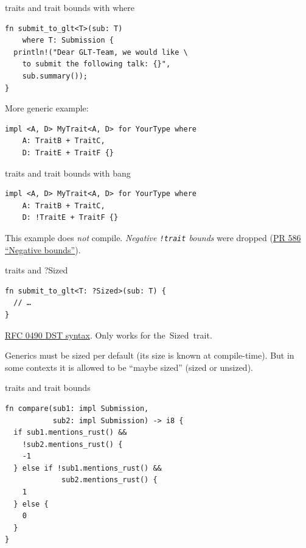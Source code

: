 \documentclass{beamer}
\newcommand\code[1]{\,{\color[HTML]{884400}#1}\,}
\begin{document}

\begin{frame}[fragile]{traits and trait bounds with where}
  \begin{verbatim}
fn submit_to_glt<T>(sub: T)
    where T: Submission {
  println!("Dear GLT-Team, we would like \
    to submit the following talk: {}",
    sub.summary());
}
  \end{verbatim}

  More generic example:
  \begin{verbatim}
impl <A, D> MyTrait<A, D> for YourType where
    A: TraitB + TraitC,
    D: TraitE + TraitF {}
  \end{verbatim}
\end{frame}

\begin{frame}[fragile]{traits and trait bounds with bang}
  \begin{verbatim}
impl <A, D> MyTrait<A, D> for YourType where
    A: TraitB + TraitC,
    D: !TraitE + TraitF {}
  \end{verbatim}

  This example does \emph{not} compile. \emph{Negative \texttt{!trait} bounds} were dropped (\href{https://github.com/rust-lang/rfcs/pull/586}{PR 586 \enquote{Negative bounds}}).
\end{frame}

\begin{frame}[fragile]{traits and ?Sized}
  \begin{verbatim}
fn submit_to_glt<T: ?Sized>(sub: T) {
  // …
}
  \end{verbatim}

  \href{https://github.com/rust-lang/rfcs/blob/master/text/0490-dst-syntax.md}{RFC 0490 DST syntax}. Only works for the \code{Sized} trait.

  Generics must be sized per default (its size is known at compile-time).
  But in some contexts it is allowed to be \enquote{maybe sized} (sized or unsized).
\end{frame}

\begin{frame}[fragile]{traits and trait bounds}
  \begin{verbatim}
fn compare(sub1: impl Submission,
           sub2: impl Submission) -> i8 {
  if sub1.mentions_rust() &&
    !sub2.mentions_rust() {
    -1
  } else if !sub1.mentions_rust() &&
             sub2.mentions_rust() {
    1
  } else {
    0
  }
}
  \end{verbatim}
\end{frame}
\end{document}
